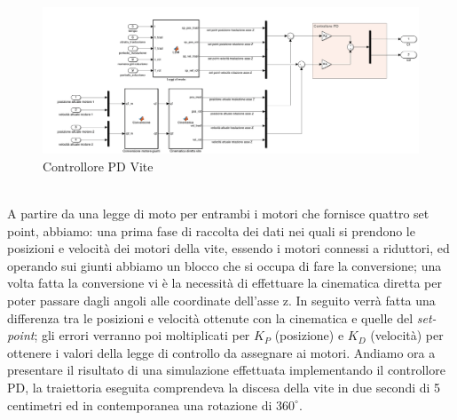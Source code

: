 \begin{figure}[ht]
	\begin{center}
		\includegraphics[scale=0.35]{Immagini/Controllori/Vite}
		\caption{Controllore PD Vite}
		\label{fig:PDVite}
	\end{center}
\end{figure}
\\A partire da una legge di moto per entrambi i motori che fornisce quattro set point, abbiamo: una prima fase di raccolta dei dati nei quali si prendono le posizioni e velocità dei motori della vite, essendo i motori connessi a riduttori, ed operando sui giunti abbiamo un blocco che si occupa di fare la conversione; una volta fatta la conversione vi è la necessità di effettuare la cinematica diretta per poter passare dagli angoli alle coordinate dell'asse z. In seguito verrà fatta una differenza tra le posizioni e velocità ottenute con la cinematica e quelle del \textit{set-point}; gli errori verranno poi moltiplicati per $K_P$ (posizione) e $K_D$ (velocità) per ottenere i valori della legge di controllo da assegnare ai motori.
Andiamo ora a presentare il risultato di una simulazione effettuata implementando il controllore PD, la traiettoria eseguita comprendeva la discesa della vite in due secondi di 5 centimetri ed in contemporanea una rotazione di $360^\circ$.
